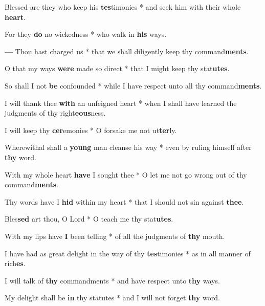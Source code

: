 \begin{multicols}{2}
	Blessed are they who keep his \textbf{tes}timonies * and seek him with their whole \textbf{heart}.
	
	For they \textbf{do} no wickedness * who walk in \textbf{his} ways.
	
	\textbf{---} Thou hast charged us * that we shall diligently keep thy command\textbf{ments}.
	
	O that my ways \textbf{were} made so direct * that I might keep thy stat\textbf{utes}.
	
	So shall I not \textbf{be} confounded * while I have respect unto all thy command\textbf{ments}.
	
	I will thank thee \textbf{with} an unfeigned heart * when I shall have learned the judgments of thy right\textbf{eous}ness.
	
	I will keep thy \textbf{cer}emonies * O forsake me not ut\textbf{ter}ly.
	
	Wherewithal shall a \textbf{young} man cleanse his way * even by ruling himself after \textbf{thy} word.
	
	With my whole heart \textbf{have} I sought thee * O let me not go wrong out of thy command\textbf{ments}.
	
	Thy words have I \textbf{hid} within my heart * that I should not sin against \textbf{thee}.
	
	Bles\textbf{sed} art thou, O Lord * O teach me thy stat\textbf{utes}.
	
	With my lips have \textbf{I} been telling * of all the judgments of \textbf{thy} mouth.
	
	I have had as great delight in the way of thy \textbf{tes}timonies * as in all manner of rich\textbf{es}.
	
	I will talk of \textbf{thy} commandments * and have respect unto \textbf{thy} ways.
	
	My delight shall be \textbf{in} thy statutes * and I will not forget \textbf{thy} word.
\end{multicols}